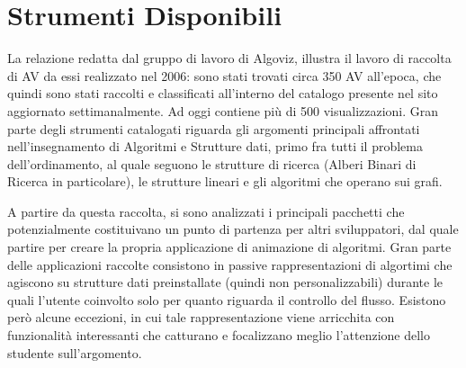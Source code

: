 \section{\label{sec:Strumenti-Disponibili}Strumenti Disponibili}

La relazione \cite{AlgoViz} redatta dal gruppo di lavoro di Algoviz,
illustra il lavoro di raccolta di AV da essi realizzato nel 2006:
sono stati trovati circa 350 AV all'epoca, che quindi sono stati raccolti
e classificati all'interno del catalogo presente nel sito aggiornato
settimanalmente. Ad oggi contiene più di 500 visualizzazioni. Gran
parte degli strumenti catalogati riguarda gli argomenti principali
affrontati nell'insegnamento di Algoritmi e Strutture dati, primo
fra tutti il problema dell'ordinamento, al quale seguono le strutture
di ricerca (Alberi Binari di Ricerca in particolare), le strutture
lineari e gli algoritmi che operano sui grafi.

A partire da questa raccolta, si sono analizzati i principali pacchetti
che potenzialmente costituivano un punto di partenza per altri sviluppatori,
dal quale partire per creare la propria applicazione di animazione
di algoritmi. Gran parte delle applicazioni raccolte consistono in
passive rappresentazioni di algortimi che agiscono su strutture dati
preinstallate (quindi non personalizzabili) durante le quali l'utente
coinvolto solo per quanto riguarda il controllo del flusso. Esistono
però alcune eccezioni, in cui tale rappresentazione viene arricchita
con funzionalità interessanti che catturano e focalizzano meglio l'attenzione
dello studente sull'argomento.

